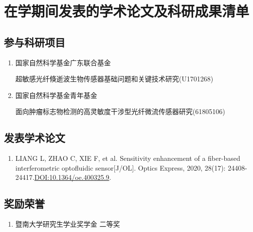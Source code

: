
\chapter{在学期间发表的学术论文及科研成果清单}

\section*{参与科研项目}

\begin{enumerate}
	\item 国家自然科学基金广东联合基金
	
	超敏感光纤倏逝波生物传感器基础问题和关键技术研究(U1701268) 
	
	\item 国家自然科学基金青年基金
	
	面向肿瘤标志物检测的高灵敏度干涉型光纤微流传感器研究(61805106)
\end{enumerate}


\section*{发表学术论文}

\begin{enumerate}
	\item LIANG L, ZHAO C, XIE F, et al. Sensitivity enhancement of a fiber-based interferometric optofluidic sensor[J/OL]. Optics Express, 2020, 28(17): 24408-24417.\href{https://www.osapublishing.org/oe/fulltext.cfm?uri=oe-28-17-24408&id=434138}{DOI:10.1364/oe.400325.9}.

\end{enumerate}

\section*{奖励荣誉}

\begin{enumerate}
	\item 暨南大学研究生学业奖学金 \quad 二等奖

\end{enumerate}


